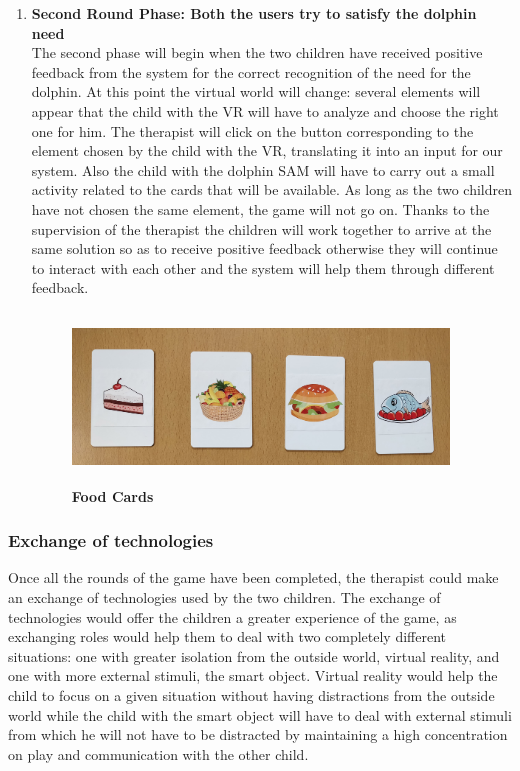 \documentclass [12pt]{article}
\begin{document}
\begin{enumerate}
\begin{itemize}[•]
\clearpage
\end{itemize}
\item \textbf{Second Round Phase: Both the users try to satisfy the dolphin need}\\
The second phase will begin when the two children have received positive feedback from the system for the correct recognition of the need for the dolphin. At this point the virtual world will change: several elements will appear that the child with the VR will have to analyze and choose the right one for him. The therapist will click on the button corresponding to the element chosen by the child with the VR, translating it into an input for our system. Also the child with the dolphin SAM will have to carry out a small activity related to the cards that will be available. As long as the two children have not chosen the same element, the game will not go on. Thanks to the supervision of the therapist the children will work together to arrive at the same solution so as to receive positive feedback otherwise they will continue to interact with each other and the system will help them through different feedback. 
\begin{figure}[ht!]
\centering
\includegraphics[height=4.5cm,width=10cm]{FoodCards.jpg}
\caption{\textbf{Food Cards}}
\end{figure}
\end{enumerate}

\subsubsection{Exchange of technologies}
Once all the rounds of the game have been completed, the therapist could make an exchange of technologies used by the two children.
The exchange of technologies would offer the children a greater experience of the game, as exchanging roles would help them to deal with two completely different situations: one with greater isolation from the outside world, virtual reality, and one with more external stimuli, the smart object.
Virtual reality would help the child to focus on a given situation without having distractions from the outside world while the child with the smart object will have to deal with external stimuli from which he will not have to be distracted by maintaining a high concentration on play and communication with the other child.
\end{document}
